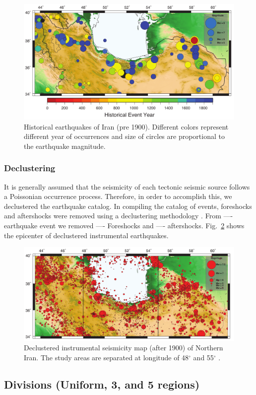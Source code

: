 \begin{figure}[!ht] 

\centering
\includegraphics[scale=0.8]{figures/pdf/Figure2.pdf} 
\caption{Historical earthquakes of Iran (pre 1900). Different colors represent different year of occurrences and size of circles are proportional to the earthquake magnitude. }
\label{fig:historical}
\end{figure}


\subsubsection{Declustering}

It is generally assumed that the seismicity of each tectonic seismic source follows a Poissonian occurrence process. Therefore, in order to accomplish this, we declustered the earthquake catalog. In compiling the catalog of events, foreshocks and aftershocks were removed using a declustering methodology \citep{Gardner1974}. From ---- earthquake event we removed ---- Foreshocks and ---- aftershocks. Fig.~\ref{fig:instrumental} shows the epicenter of declustered instrumental  earthquakes.


\begin{figure}[!ht] 

\centering
\includegraphics[scale=0.8]{figures/pdf/Figure3.pdf} 
\caption{Declustered instrumental seismicity map (after 1900) of Northern Iran. The study areas are separated at longitude of 48$^{\circ}$ and 55$^{\circ}$ . } 
\label{fig:instrumental}
\end{figure}


\subsection{Divisions (Uniform, 3, and 5 regions)}

